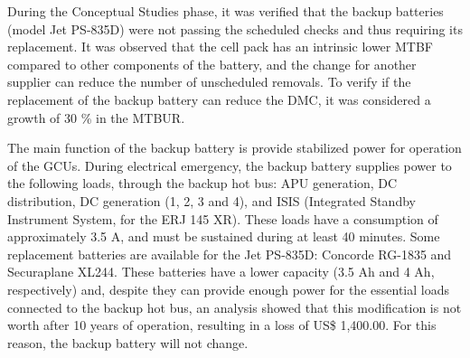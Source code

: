 During the Conceptual Studies phase, it was verified that the backup batteries (model Jet PS-835D) were not passing the scheduled checks and thus requiring its replacement. It was observed that the cell pack has an intrinsic lower MTBF compared to other components of the battery, and the change for another supplier can reduce the number of unscheduled removals. To verify if the replacement of the backup battery can reduce the DMC, it was considered a growth of 30 \% in the MTBUR.

The main function of the backup battery is provide stabilized power for operation of the GCUs. During electrical emergency, the backup battery supplies power to the following loads, through the backup hot bus: APU generation, DC distribution, DC generation (1, 2, 3 and 4), and ISIS (Integrated Standby Instrument System, for the ERJ 145 XR). These loads have a consumption of approximately 3.5 A, and must be sustained during at least 40 minutes. Some replacement batteries are available for the Jet PS-835D: Concorde RG-1835 and Securaplane XL244. These batteries have a lower capacity (3.5 Ah and 4 Ah, respectively) and, despite they can provide enough power for the essential loads connected to the backup hot bus, an analysis showed that this modification is not worth after 10 years of operation, resulting in a loss of US\$ 1,400.00. For this reason, the backup battery will not change.
